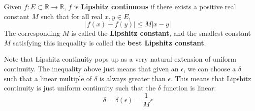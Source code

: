   \begin{definition}
    Given $f: E \subset \mathbb{R} \longrightarrow \mathbb{R}$, $f$ is \textbf{Lipshitz continuous} if there exists a positive real constant $M$ such that for all real $x, y \in E$, 
    \[\big| f(x) - f(y) \big| \leq M \big| x - y \big|\]
    The corresponding $M$ is called the \textbf{Lipshitz constant}, and the smallest constant $M$ satisfying this inequality is called the \textbf{best Lipshitz constant}. 
  \end{definition}

  Note that Lipshitz continuity pops up as a very natural extension of uniform continuity. The inequality above just means that given an $\epsilon$, we can choose a $\delta$ such that a linear multiple of $\delta$ is always greater than $\epsilon$. This means that Lipshitz continuity is just uniform continuity such that the $\delta$ function is linear:  
  \begin{equation}
    \delta = \delta(\epsilon) = \frac{1}{M} \epsilon
  \end{equation}

